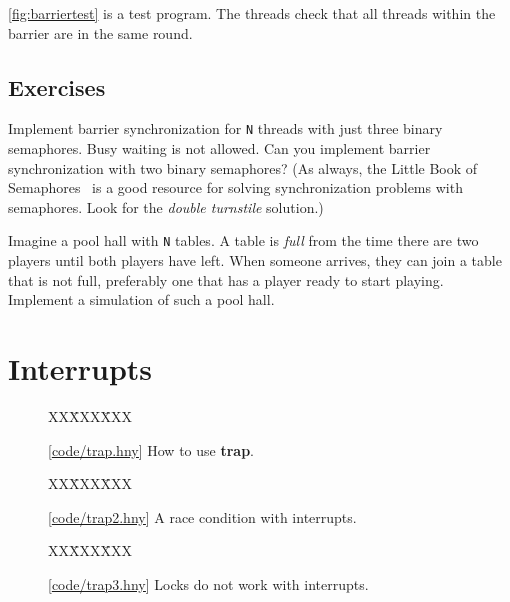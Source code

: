 \documentclass{report}
\newcommand{\harmonysource}[1]{
\begin{tabbing}
XX\=XXX\=XXX\kill
    
\end{tabbing}
}
\newcommand{\harmonylink}[1]{%
[\href{https://harmony.cs.cornell.edu/#1}{\underline{#1}}]%
}
\newenvironment{code}{
\tcolorbox
}{
\endtcolorbox
}
\begin{document}
\autoref{fig:barriertest} is a test program.  The threads check
that all threads within the barrier are in the same round.

\section*{Exercises}
\begin{problems}
\item Implement barrier synchronization for \texttt{N} threads
with just three binary semaphores.  Busy waiting is not allowed.
Can you implement barrier synchronization with two binary semaphores?
(As always, the Little Book of Semaphores~\cite{Downey09} is a good resource
for solving synchronization problems with semaphores.
Look for the \emph{double turnstile}
%
solution.)
\item Imagine a pool hall with \texttt{N} tables.  A table is \emph{full}
from the time there are two players until both players have left.
When someone arrives, they can join a table that is not full, preferably
one that has a player ready to start playing.
Implement a simulation of such a pool hall.
\end{problems}

\chapter{Interrupts}
\label{ch:interrupts}

\begin{figure}
\begin{code}
\harmonysource{trap}
\end{code}
\caption{\harmonylink{code/trap.hny} How to use \textbf{trap}.}
\label{fig:trap}
\end{figure}

\begin{figure}
\begin{code}
\harmonysource{trap2}
\end{code}
\caption{\harmonylink{code/trap2.hny} A race condition with interrupts.}
\label{fig:trap2}
\end{figure}

\begin{figure}
\begin{code}
\harmonysource{trap3}
\end{code}
\caption{\harmonylink{code/trap3.hny} Locks do not work with interrupts.}
\label{fig:trap3}
\end{figure}
\end{document}
